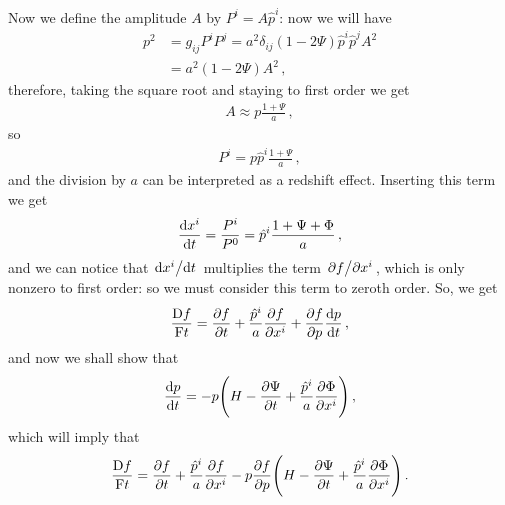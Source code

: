 \documentclass[main.tex]{subfiles}
\begin{document}
Now we define the amplitude \(A\) by \(P^{i} = A \hat{p}^{i}\): now we will have 
%
\begin{subequations}
\begin{align}
p^2 &= g_{ij} P^{i} P^{j} = a^2 \delta_{ij} (1 - 2 \Psi  ) \hat{p}^{i} \hat{p}^{j} A^2  \\
&= a^2(1 -2 \Psi ) A^2
\,,
\end{align}
\end{subequations}
%
therefore, taking the square root and staying to first order we get 
%
\begin{align}
A \approx p \frac{1+\Psi }{a}
\,,
\end{align}
%
so 
%
\begin{align}
P^{i} = p \hat{p}^{i} \frac{1 + \Psi }{a}
\,,
\end{align}
%
and the division by \(a\) can be interpreted as a redshift effect. 
Inserting this term we get 
%
\begin{align}
\dv{x^{i}}{t} = \frac{P^{i}}{P^{0}} = \hat{p}^{i} \frac{1 + \Psi + \Phi }{a}
\,,
\end{align}
%
and we can notice that \(\dv*{x^{i}}{t}\) multiplies the term \(\pdv*{f}{x^{i}}\), which is only nonzero to first order: so we must consider this term to zeroth order. So, we get 
%
\begin{align}
\frac{\mathrm{D}f}{\mathrm{F}t} = \pdv{f}{t}
+ \frac{\hat{p}^{i} }{a} \pdv{f}{x^{i}}
+ \pdv{f}{p} \dv{p}{t}
\,,
\end{align}
%
and now we shall show that 
%
\begin{align}
\dv{p}{t} = - p \qty(H - \pdv{\Psi }{t} + \frac{\hat{p}^{i}}{a} \pdv{\Phi }{x^{i}})
\,,
\end{align}
%
which will imply that 
%
\begin{align}
\frac{\mathrm{D}f}{\mathrm{F}t} = \pdv{f}{t}
+ \frac{\hat{p}^{i} }{a} \pdv{f}{x^{i}}
- p \pdv{f}{p} \qty(H - \pdv{\Psi }{t} + \frac{\hat{p}^{i}}{a} \pdv{\Phi }{x^{i}})  
\,.
\end{align}
\end{document}
